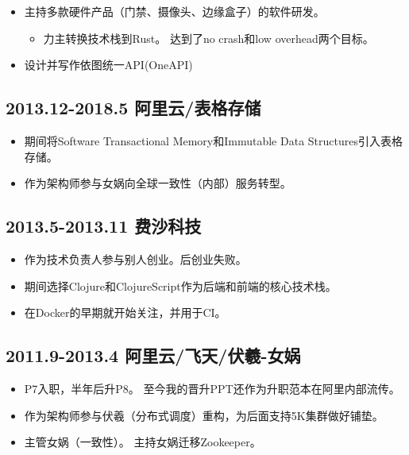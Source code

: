 \documentclass[scheme=plain]{ctexart}
\begin{document}
\begin{itemize}
    \item 主持多款硬件产品（门禁、摄像头、边缘盒子）的软件研发。
        \begin{itemize}
            \item 力主转换技术栈到Rust。
                达到了no crash和low overhead两个目标。
        \end{itemize}
    \item 设计并写作依图统一API(OneAPI)
\end{itemize}

\subsection*{2013.12-2018.5 阿里云/表格存储}

\begin{itemize}
    \item 期间将Software Transactional Memory和Immutable Data Structures引入表格存储。
    \item 作为架构师参与女娲向全球一致性（内部）服务转型。
\end{itemize}

\subsection*{2013.5-2013.11 费沙科技}

\begin{itemize}
    \item 作为技术负责人参与别人创业。后创业失败。
    \item 期间选择Clojure和ClojureScript作为后端和前端的核心技术栈。
    \item 在Docker的早期就开始关注，并用于CI。
\end{itemize}

\subsection*{2011.9-2013.4 阿里云/飞天/伏羲-女娲}

\begin{itemize}
    \item P7入职，半年后升P8。
        至今我的晋升PPT还作为升职范本在阿里内部流传。
    \item 作为架构师参与伏羲（分布式调度）重构，为后面支持5K集群做好铺垫。
    \item 主管女娲（一致性）。
        主持女娲迁移Zookeeper。
\end{itemize}
\end{document}
